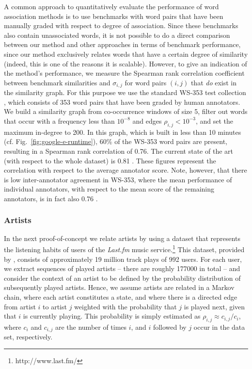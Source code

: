\documentclass{kais}
\newcommand{\rn}[1]{\rho_{#1}}
\newcommand{\sy}[1]{\sigma_{#1}}
\begin{document}
A common approach to quantitatively evaluate the performance of word association methods is to use benchmarks
with word pairs that have been manually graded with respect to degree of association. Since these
benchmarks also contain unassociated words, it is not possible to do a direct comparison between our
method and other
approaches in terms of benchmark performance, since our method exclusively relates words that have a certain
degree of similarity (indeed, this is one of the reasons it is scalable). However, to give an indication of
the method's performance, we measure the Spearman rank correlation coefficient between benchmark
similarities and $\sy{i,j}$ for word pairs $(i, j)$ that \emph{do} exist in the similarity graph. For this purpose we
use the standard WS-353 test collection \cite{Finkelstein01}, which consists of 353 word pairs that have
been graded by human annotators. We build a similarity graph from co-occurrence windows of size 5, filter
out words that occur with a frequency less than $10^{-8}$ and edges $\rn{i,j} < 10^{-3}$, and
set the maximum in-degree to 200. In this graph, which is built in less than 10 minutes (cf. Fig.\ \ref{fig:google-e-runtime}),
60\% of the WS-353 word pairs are present, resulting in a Spearman rank correlation of 0.76. The current state of the
art (with respect to the whole dataset) is 0.81 \cite{Halawi12,Yih12}.
These figures represent the correlation with respect to the average annotator score. Note, however,
that there is low inter-annotator agreement in WS-353, where the mean performance
of individual annotators, with respect to the mean score of the remaining annotators, is in fact also 0.76 \cite{Hill14}.

\subsubsection{Artists}
In the next proof-of-concept we relate artists by using a dataset that represents the listening
habits of users of the \emph{Last.fm} music service.\footnote{http://www.last.fm/} This dataset, provided by
, consists of approximately 19 million track plays of 992 users. For each user, we extract sequences of
played artists -- there are roughly 177000 in total -- and consider the context of an artist to be defined by the probability
distribution of subsequently played artists. Hence, we assume artists are related in a Markov chain, where each artist
constitutes a state, and where there is a directed edge from artist $i$ to artist $j$ weighted with the probability
that $j$ is played next, given that $i$ is currently playing. This probability is simply estimated as $\rn{i,j} \approx
c_{i,j}/c_i$, where $c_i$ and $c_{i,j}$ are the number of times $i$, and $i$ followed by $j$ occur in the data set,
respectively.
\end{document}
